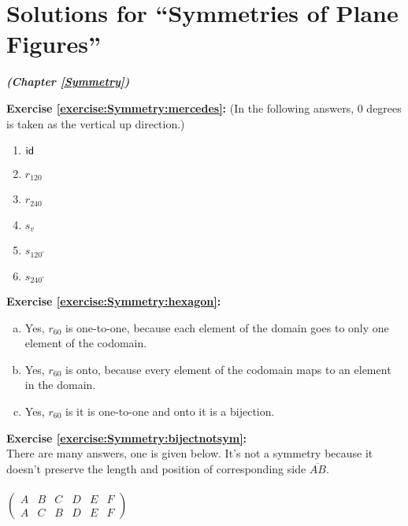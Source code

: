 \section{Solutions for  ``Symmetries of Plane Figures''}
\noindent\textbf{\textit{ (Chapter \ref{Symmetry})}}\bigskip

\noindent\textbf{Exercise \ref{exercise:Symmetry:mercedes}:}
(In the following answers, 0 degrees is taken as the vertical up direction.)
\begin{multicols}{3}
\begin{enumerate}
\item
$\sf{id}$

\item
$r_{120}$

\item
$r_{240}$

\item
$s_v$

\item
$s_{120^{\circ}}$

\item
$s_{240^{\circ}}$
\end{enumerate}
\end{multicols}

\noindent\textbf{Exercise \ref{exercise:Symmetry:hexagon}:}
\begin{enumerate}[(a)]
\item
Yes, $r_{60}$ is one-to-one, because each element of the domain goes to only one element of the codomain.

\item
Yes, $r_{60}$ is onto, because every element of the codomain maps to an element in the domain.

\item
Yes, $r_{60}$ is it is one-to-one and onto it is a bijection.
\end{enumerate}

\noindent\textbf{Exercise \ref{exercise:Symmetry:bijectnotsym}:}\\
There are many answers, one is given below.  It's not a symmetry because it doesn't preserve the length and position of corresponding side $\overline{AB}$.\\
\\
$\begin{pmatrix}
A & B & C & D & E & F\\
A & C & B & D & E & F
\end{pmatrix}$\\

